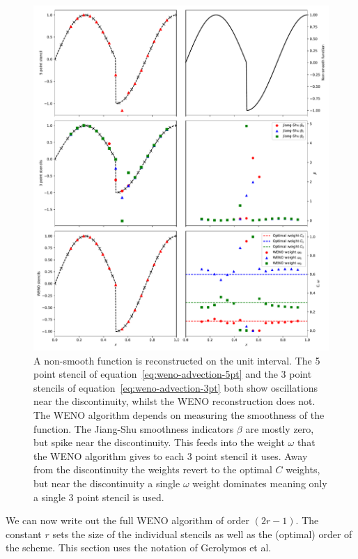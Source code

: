 \begin{figure}
  \includegraphics[width=0.96\linewidth]{weno-weights}
  \caption[WENO reconstruction and weights]{A non-smooth function is reconstructed on the unit interval. The 5 point stencil of equation~\eqref{eq:weno-advection-5pt} and the 3 point stencils of equation~\eqref{eq:weno-advection-3pt} both show oscillations near the discontinuity, whilst the WENO reconstruction does not. The WENO algorithm depends on measuring the smoothness of the function. The Jiang-Shu smoothness indicators $\beta$ are mostly zero, but spike near the discontinuity. This feeds into the weight $\omega$ that the WENO algorithm gives to each 3 point stencil it uses. Away from the discontinuity the weights revert to the optimal $C$ weights, but near the discontinuity a single $\omega$ weight dominates meaning only a single 3 point stencil is used.}
  \label{fig:weno-weights}
\end{figure}

We can now write out the full WENO algorithm of order $(2 r - 1)$. The constant
$r$ sets the size of the individual stencils as well as the (optimal) order of
the scheme. This section uses the notation of Gerolymos et al.

